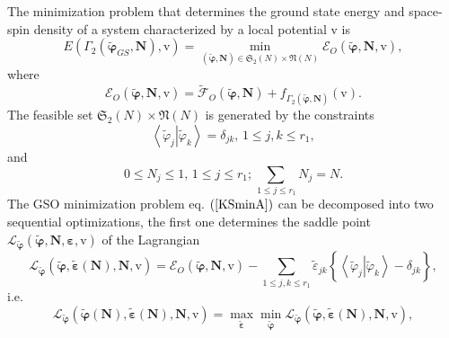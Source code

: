 \documentclass[aps,preprint]{revtex4}%
\begin{document}
The minimization problem that determines the ground state energy and
space-spin density of a system characterized by a local potential $\mathrm{v}$
is
\begin{equation}
E\left(  \Gamma_{2}\left(  \boldsymbol{\tilde{\varphi}}_{GS}\boldsymbol{,N}%
\right)  \boldsymbol{,}\mathrm{v}\right)  =\min_{\left(  \boldsymbol{\tilde
{\varphi},N}\right)  \boldsymbol{\in}\mathfrak{S}_{2}\left(  N\right)
\times\mathfrak{N}\left(  N\right)  }\mathcal{E}_{O}\left(  \boldsymbol{\tilde
{\varphi},N,}\mathrm{v}\right)  , \label{KSminA}%
\end{equation}
where
\begin{equation}
\mathcal{E}_{O}\left(  \boldsymbol{\tilde{\varphi},N,}\mathrm{v}\right)
=\mathcal{\tilde{F}}_{O}\left(  \boldsymbol{\tilde{\varphi},N}\right)
+f_{\Gamma_{2}\left(  \boldsymbol{\tilde{\varphi},N}\right)  }\left(
\mathrm{v}\right)  .
\end{equation}
The feasible set $\mathfrak{S}_{2}\left(  N\right)  \times\mathfrak{N}\left(
N\right)  $ is generated by the constraints
\begin{equation}
\left\langle \left.  \tilde{\varphi}_{j}\right\vert \tilde{\varphi}%
_{k}\right\rangle =\delta_{jk},\,1\leq j,k\leq r_{1},
\end{equation}
and
\begin{equation}
0\leq N_{j}\leq1,\,1\leq j\leq r_{1};\sum_{\,1\leq j\leq r_{1}}N_{j}=N.
\end{equation}
The GSO minimization problem eq. $\left(  \ref{KSminA}\right)  $ can be
decomposed into two sequential optimizations, the first one determines the
saddle point $\mathcal{L}_{\boldsymbol{\tilde{\varphi}}}\left(
\boldsymbol{\tilde{\varphi},N},\boldsymbol{\varepsilon},\mathrm{v}\right)  $
of the Lagrangian
\begin{equation}
\mathcal{L}_{\boldsymbol{\tilde{\varphi}}}\left(  \boldsymbol{\tilde{\varphi}%
},\boldsymbol{\tilde{\varepsilon}}\left(  \boldsymbol{N}\right)
\boldsymbol{,N,}\mathrm{v}\right)  =\mathcal{E}_{O}\left(  \boldsymbol{\tilde
{\varphi},N,}\mathrm{v}\right)  -\sum_{1\leq j,k\leq r_{1}}\tilde{\varepsilon
}_{jk}\left\{  \overset{}{\left\langle \left.  \tilde{\varphi}_{j}\right\vert
\tilde{\varphi}_{k}\right\rangle -\delta_{jk}}\right\}  ,
\end{equation}
i.e.
\begin{equation}
\mathcal{L}_{\boldsymbol{\tilde{\varphi}}}\left(  \boldsymbol{\tilde{\varphi}%
}\left(  \boldsymbol{N}\right)  ,\boldsymbol{\tilde{\varepsilon}}\left(
\boldsymbol{N}\right)  ,\boldsymbol{N,}\mathrm{v}\right)  =\max
_{\boldsymbol{\tilde{\varepsilon}}}\min_{\boldsymbol{\tilde{\varphi}}%
}\mathcal{L}_{\boldsymbol{\tilde{\varphi}}}\left(  \boldsymbol{\tilde{\varphi
}},\boldsymbol{\tilde{\varepsilon}}\left(  \boldsymbol{N}\right)
\boldsymbol{,N,}\mathrm{v}\right)  , \label{KSM1A}%
\end{equation}
\end{document}
